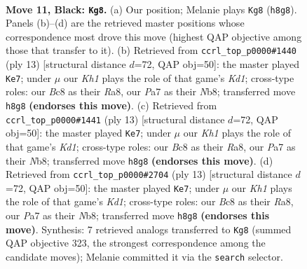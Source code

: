 \documentclass[11pt]{article}
\begin{document}
\clearpage

\begin{figure}[p]\centering
\begin{subfigure}{0.46\textwidth}\centering
\resizebox{\linewidth}{!}{%
\newchessgame
\chessboard[
  setfen={rnbr3k/ppp1ppbp/1n4p1/4P3/P1P4P/1B3N2/1P3PP1/RNB1K2R b KQ - 0 11},
  showmover=false,
  pgfstyle=straightmove, color=movearrow, markmove={h8-g8}
]}
\caption{}
\end{subfigure}\hfill
\begin{subfigure}{0.46\textwidth}\centering
\resizebox{\linewidth}{!}{%
\newchessgame
\chessboard[
  setfen={rnbk3r/ppp2ppp/3b1n2/4p3/2B1P3/2N2N2/PPP2PPP/R1B1K2R b KQ - 3 7},
  showmover=false,
  pgfstyle=straightmove, color=movearrow, markmove={d8-e7}
]}
\caption{}
\end{subfigure}
\\[4pt]
\begin{subfigure}{0.46\textwidth}\centering
\resizebox{\linewidth}{!}{%
\newchessgame
\chessboard[
  setfen={rnbk3r/ppp2ppp/3b1n2/4p3/2B1P3/2N2N2/PPP2PPP/R1B1K2R b KQ - 3 7},
  showmover=false,
  pgfstyle=straightmove, color=movearrow, markmove={d8-e7}
]}
\caption{}
\end{subfigure}\hfill
\begin{subfigure}{0.46\textwidth}\centering
\resizebox{\linewidth}{!}{%
\newchessgame
\chessboard[
  setfen={rnbk3r/ppp2ppp/3b1n2/4p3/2B1P3/2N2N2/PPP2PPP/R1B1K2R b KQ - 3 7},
  showmover=false,
  pgfstyle=straightmove, color=movearrow, markmove={d8-e7}
]}
\caption{}
\end{subfigure}
\caption{\textbf{Move 11, Black: \texttt{Kg8}.} (a) Our position; Melanie plays \texttt{Kg8} (\texttt{h8g8}). Panels (b)--(d) are the retrieved master positions whose correspondence most drove this move (highest QAP objective among those that transfer to it). (b) Retrieved from \texttt{ccrl\_top\_p0000\#1440} (ply 13) [structural distance $d$=72, QAP obj=50]: the master played \texttt{Ke7}; under $\mu$ our \emph{Kh1} plays the role of that game's \emph{Kd1}; cross-type roles: our \emph{B}c8 as their \emph{R}a8, our \emph{P}a7 as their \emph{N}b8; transferred move \texttt{h8g8} \textbf{(endorses this move)}. (c) Retrieved from \texttt{ccrl\_top\_p0000\#1441} (ply 13) [structural distance $d$=72, QAP obj=50]: the master played \texttt{Ke7}; under $\mu$ our \emph{Kh1} plays the role of that game's \emph{Kd1}; cross-type roles: our \emph{B}c8 as their \emph{R}a8, our \emph{P}a7 as their \emph{N}b8; transferred move \texttt{h8g8} \textbf{(endorses this move)}. (d) Retrieved from \texttt{ccrl\_top\_p0000\#2704} (ply 13) [structural distance $d$=72, QAP obj=50]: the master played \texttt{Ke7}; under $\mu$ our \emph{Kh1} plays the role of that game's \emph{Kd1}; cross-type roles: our \emph{B}c8 as their \emph{R}a8, our \emph{P}a7 as their \emph{N}b8; transferred move \texttt{h8g8} \textbf{(endorses this move)}. Synthesis: 7 retrieved analogs transferred to \texttt{Kg8} (summed QAP objective 323, the strongest correspondence among the candidate moves); Melanie committed it via the \texttt{search} selector.}
\label{fig:thought-m21}
\end{figure}
\end{document}
